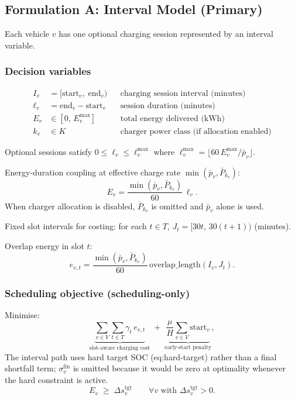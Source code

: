 \documentclass[11pt,a4paper]{article}
\newcommand{\1}{\mathbf{1}}
\begin{document}
\subsection{Formulation A: Interval Model (Primary)}

Each vehicle $v$ has one optional charging session represented by an interval variable.

\subsubsection{Decision variables}

\begin{align}
  I_v &= [\mathrm{start}_v,\;\mathrm{end}_v) && \text{charging session interval (minutes)} \\
  \ell_v &= \mathrm{end}_v - \mathrm{start}_v && \text{session duration (minutes)} \\
  E_v &\in [0,\, E_v^{\max}] && \text{total energy delivered (kWh)} \\
  k_v &\in K && \text{charger power class (if allocation enabled)}
\end{align}

Optional sessions satisfy $0 \le \ell_v \le \ell_v^{\max}$ where
$\ell_v^{\max} = \lfloor 60\, E_v^{\max} / \bar{p}_v \rfloor$.

Energy-duration coupling at effective charge rate $\min(\bar{p}_v, \bar{P}_{k_v})$:
\begin{equation}
  \label{eq:energy-duration}
  E_v = \frac{\min(\bar{p}_v, \bar{P}_{k_v})}{60}\,\ell_v.
\end{equation}
When charger allocation is disabled, $\bar{P}_{k_v}$ is omitted and $\bar{p}_v$ alone
is used.

Fixed slot intervals for costing: for each $t \in T$,
$J_t = [30t,\, 30(t+1))$ (minutes).

Overlap energy in slot $t$:
\begin{equation}
  \label{eq:overlap-energy}
  e_{v,t} = \frac{\min(\bar{p}_v, \bar{P}_{k_v})}{60}\,\mathrm{overlap\_length}(I_v, J_t).
\end{equation}

\subsubsection{Scheduling objective (scheduling-only)}

Minimise:
\begin{equation}
  \label{eq:sched-interval-obj}
  \underbrace{\sum_{v \in V}\sum_{t \in T} \gamma_t\, e_{v,t}}_{\text{slot-aware charging cost}}
  \;+\;
  \underbrace{\frac{\mu}{H}\sum_{v \in V} \mathrm{start}_v}_{\text{early-start penalty}},
\end{equation}
The interval path uses hard target SOC (eq:hard-target) rather than a final
shortfall term; $\sigma_v^{\mathrm{fin}}$ is omitted because it would be zero at
optimality whenever the hard constraint is active.
\begin{equation}
  \label{eq:hard-target}
  E_v \;\ge\; \Delta s_v^{\mathrm{tgt}} \qquad \forall v \text{ with } \Delta s_v^{\mathrm{tgt}} > 0.
\end{equation}
\end{document}
